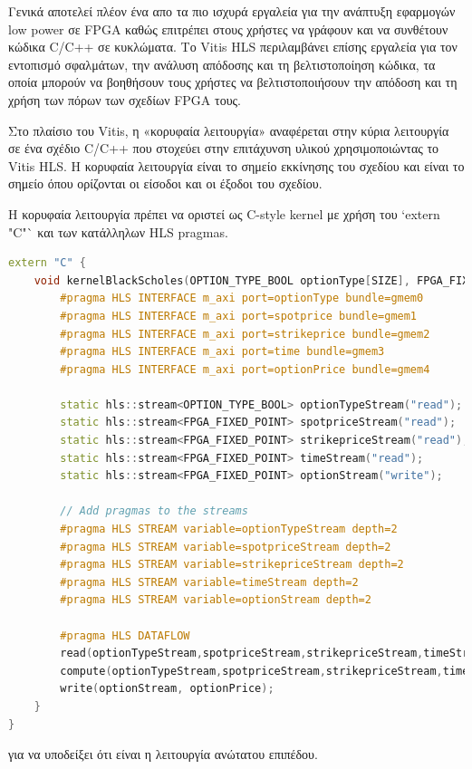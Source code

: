 Γενικά αποτελεί πλέον ένα απο τα πιο ισχυρά εργαλεία για την ανάπτυξη εφαρμογών low power σε FPGA καθώς επιτρέπει στους χρήστες να γράφουν και να συνθέτουν κώδικα C/C++ σε κυκλώματα.
Το Vitis HLS περιλαμβάνει επίσης εργαλεία για τον εντοπισμό σφαλμάτων, την ανάλυση απόδοσης και τη βελτιστοποίηση κώδικα, τα οποία μπορούν να βοηθήσουν τους χρήστες
να βελτιστοποιήσουν την απόδοση και τη χρήση των πόρων των σχεδίων FPGA τους.

Στο πλαίσιο του Vitis, η «κορυφαία λειτουργία» αναφέρεται στην κύρια λειτουργία σε ένα σχέδιο C/C++ που στοχεύει στην επιτάχυνση υλικού χρησιμοποιώντας το Vitis HLS.
Η κορυφαία λειτουργία είναι το σημείο εκκίνησης του σχεδίου και είναι το σημείο όπου ορίζονται οι είσοδοι και οι έξοδοι του σχεδίου.

Η κορυφαία λειτουργία πρέπει να οριστεί ως C-style kernel με χρήση του `extern "C"` και των κατάλληλων HLS pragmas.

\begin{lstlisting}[language=C++, caption={Ορισμός κορυφαίας λειτουργίας στο Vitis HLS}]
extern "C" {
    void kernelBlackScholes(OPTION_TYPE_BOOL optionType[SIZE], FPGA_FIXED_POINT spotprice[SIZE], FPGA_FIXED_POINT strikeprice[SIZE],  FPGA_FIXED_POINT time[SIZE], FPGA_FIXED_POINT optionPrice[SIZE]){
        #pragma HLS INTERFACE m_axi port=optionType bundle=gmem0
        #pragma HLS INTERFACE m_axi port=spotprice bundle=gmem1
        #pragma HLS INTERFACE m_axi port=strikeprice bundle=gmem2
        #pragma HLS INTERFACE m_axi port=time bundle=gmem3
        #pragma HLS INTERFACE m_axi port=optionPrice bundle=gmem4

        static hls::stream<OPTION_TYPE_BOOL> optionTypeStream("read");
        static hls::stream<FPGA_FIXED_POINT> spotpriceStream("read");
        static hls::stream<FPGA_FIXED_POINT> strikepriceStream("read");
        static hls::stream<FPGA_FIXED_POINT> timeStream("read");
        static hls::stream<FPGA_FIXED_POINT> optionStream("write");

        // Add pragmas to the streams
        #pragma HLS STREAM variable=optionTypeStream depth=2
        #pragma HLS STREAM variable=spotpriceStream depth=2
        #pragma HLS STREAM variable=strikepriceStream depth=2
        #pragma HLS STREAM variable=timeStream depth=2
        #pragma HLS STREAM variable=optionStream depth=2

        #pragma HLS DATAFLOW
        read(optionTypeStream,spotpriceStream,strikepriceStream,timeStream,optionType,spotprice,strikeprice,time);
        compute(optionTypeStream,spotpriceStream,strikepriceStream,timeStream,optionStream);
        write(optionStream, optionPrice);
    }
}
\end{lstlisting}
για να υποδείξει ότι είναι η λειτουργία ανώτατου επιπέδου.

